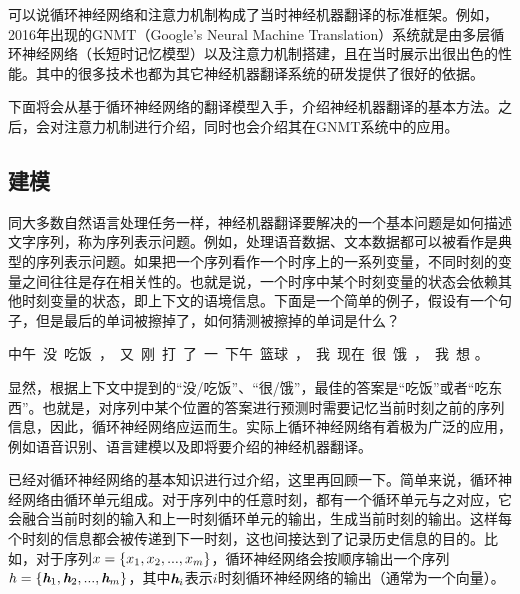\parinterval 可以说循环神经网络和注意力机制构成了当时神经机器翻译的标准框架。例如，2016年出现的GNMT（Google's Neural Machine Translation）系统就是由多层循环神经网络（长短时记忆模型）以及注意力机制搭建，且在当时展示出很出色的性能。其中的很多技术也都为其它神经机器翻译系统的研发提供了很好的依据。

\parinterval 下面将会从基于循环神经网络的翻译模型入手，介绍神经机器翻译的基本方法。之后，会对注意力机制进行介绍，同时也会介绍其在GNMT系统中的应用。

\subsection{建模}
\label{sec:10.3.1}

\parinterval 同大多数自然语言处理任务一样，神经机器翻译要解决的一个基本问题是如何描述文字序列，称为序列表示问题。例如，处理语音数据、文本数据都可以被看作是典型的序列表示问题。如果把一个序列看作一个时序上的一系列变量，不同时刻的变量之间往往是存在相关性的。也就是说，一个时序中某个时刻变量的状态会依赖其他时刻变量的状态，即上下文的语境信息。下面是一个简单的例子，假设有一个句子，但是最后的单词被擦掉了，如何猜测被擦掉的单词是什么？

\vspace{0.8em}
\centerline{中午\ 没\ 吃饭\ ，\ 又\ 刚\ 打\ 了\ 一\ 下午\ 篮球\ ，\ 我\ 现在\ 很\ 饿\ ，\ 我\ 想\underline{\quad \quad \quad} 。}
\vspace{0.8em}

\parinterval 显然，根据上下文中提到的“没/吃饭”、“很/饿”，最佳的答案是“吃饭”或者“吃东西”。也就是，对序列中某个位置的答案进行预测时需要记忆当前时刻之前的序列信息，因此，循环神经网络应运而生。实际上循环神经网络有着极为广泛的应用，例如语音识别、语言建模以及即将要介绍的神经机器翻译。

\parinterval {\chapternine}已经对循环神经网络的基本知识进行过介绍，这里再回顾一下。简单来说，循环神经网络由循环单元组成。对于序列中的任意时刻，都有一个循环单元与之对应，它会融合当前时刻的输入和上一时刻循环单元的输出，生成当前时刻的输出。这样每个时刻的信息都会被传递到下一时刻，这也间接达到了记录历史信息的目的。比如，对于序列${x}=\{x_1, x_2,..., x_m\}$，循环神经网络会按顺序输出一个序列${h}=\{ \textbf{\em h}_1, \textbf{\em h}_2,..., \textbf{\em h}_m \}$，其中$\textbf{\em h}_i$表示$i$时刻循环神经网络的输出（通常为一个向量）。
\vspace{-0.6em}

